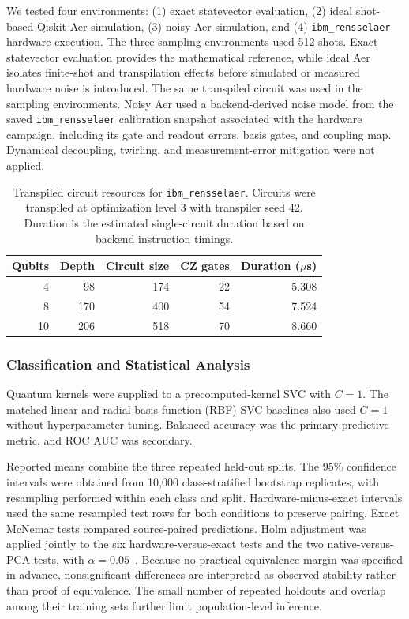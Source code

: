 \documentclass[letterpaper]{article} %
\begin{document}
We tested four environments: (1) exact statevector evaluation, (2) ideal shot-based Qiskit Aer simulation, (3) noisy Aer simulation, and (4) \texttt{ibm\_rensselaer} hardware execution. The three sampling environments used 512 shots. Exact statevector evaluation provides the mathematical reference, while ideal Aer isolates finite-shot and transpilation effects before simulated or measured hardware noise is introduced. The same transpiled circuit was used in the sampling environments. Noisy Aer used a backend-derived noise model from the saved \texttt{ibm\_rensselaer} calibration snapshot associated with the hardware campaign, including its gate and readout errors, basis gates, and coupling map. Dynamical decoupling, twirling, and measurement-error mitigation were not applied.



\begin{table}[t]
  \centering
  \small
  \caption{Transpiled circuit resources for \texttt{ibm\_rensselaer}.
  Circuits were transpiled at optimization level 3 with transpiler
  seed 42. Duration is the estimated single-circuit duration based on backend instruction timings.}
  \label{tab:circuit-resources}
  \begin{tabular}{rrrrr}
  \toprule
  Qubits & Depth & Circuit size & CZ gates & Duration ($\mu$s) \\
  \midrule
  4  & 98  & 174 & 22 & 5.308 \\
  8  & 170 & 400 & 54 & 7.524 \\
  10 & 206 & 518 & 70 & 8.660 \\
  \bottomrule
  \end{tabular}
  \end{table}

\subsubsection{Classification and Statistical Analysis}

Quantum kernels were supplied to a precomputed-kernel SVC with $C=1$. The matched linear and radial-basis-function (RBF) SVC baselines also used $C=1$ without hyperparameter tuning. Balanced accuracy was the primary predictive metric, and ROC AUC was secondary.

Reported means combine the three repeated held-out splits. The 95\% confidence intervals were obtained from 10,000 class-stratified bootstrap replicates, with resampling performed within each class and split. Hardware-minus-exact intervals used the same resampled test rows for both conditions to preserve pairing. Exact McNemar tests compared source-paired predictions. Holm adjustment was applied jointly to the six hardware-versus-exact tests and the two native-versus-PCA tests, with $\alpha=0.05$~\cite{mcnemar1947,holm1979}. Because no practical equivalence margin was specified in advance, nonsignificant differences are interpreted as observed stability rather than proof of equivalence. The small number of repeated holdouts and overlap among their training sets further limit population-level inference.
\end{document}
